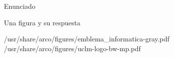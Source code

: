 \documentclass{arco-exam}
\begin{document}
\begin{questions}
\begin{arcoQuestion}{5}

\end{arcoQuestion}


\question
Enunciado

\begin{arcoQuestion}{5}
  Una figura y su respuesta



                     {/usr/share/arco/figures/emblema_informatica-gray.pdf}
                     {/usr/share/arco/figures/uclm-logo-bw-mp.pdf}
\end{arcoQuestion}


\end{questions}
\end{document}
